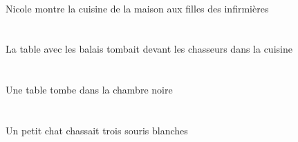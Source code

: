 \begin{exe}
\INDSgErgG{}   \NicoleDSgErgG{}    \DEFPlDatG{}    \DEFPlOblG{}   \infirmiereBPlOblG{}   \DEG{}   \filleCPlDatG{}   \DEFSgAbsG{}    \DEFSgOblG{}   \maisonDSgOblG{}   \DEG{}   \cuisineCSgAbsG{}  \montrerVdPrsCSgG{}\\
Nicole montre la cuisine de la maison aux filles des infirmières
\ex\glll
\DEFSgAbs{}    \DEFPlObl{}   \balaiCPlObl{}   \AVEC{}   \tableCSgAbs{}    \DEFPlObl{}    \DEFSgObl{}   \cuisineCSgObl{}   \DANS{}   \chasseurCPlObl{}   \DEVANT{}  \tomberViPstCSg{}\\
\DEFSgAbsP{}    \DEFPlOblP{}   \balaiCPlOblP{}   \AVECP{}   \tableCSgAbsP{}    \DEFPlOblP{}    \DEFSgOblP{}   \cuisineCSgOblP{}   \DANSP{}   \chasseurCPlOblP{}   \DEVANTP{}  \tomberViPstCSgP{}\\
\DEFSgAbsG{}    \DEFPlOblG{}   \balaiCPlOblG{}   \AVECG{}   \tableCSgAbsG{}    \DEFPlOblG{}    \DEFSgOblG{}   \cuisineCSgOblG{}   \DANSG{}   \chasseurCPlOblG{}   \DEVANTG{}  \tomberViPstCSgG{}\\
La table avec les balais tombait devant les chasseurs dans la cuisine
\ex\glll
\DEFSgObl{}   \noirBSg{}   \chambreBSgObl{}   \DANS{}   \INDSgAbs{}   \tableCSgAbs{}  \tomberViPrsCSg{}\\
\DEFSgOblP{}   \noirBSgP{}   \chambreBSgOblP{}   \DANSP{}   \INDSgAbsP{}   \tableCSgAbsP{}  \tomberViPrsCSgP{}\\
\DEFSgOblG{}   \noirBSgG{}   \chambreBSgOblG{}   \DANSG{}   \INDSgAbsG{}   \tableCSgAbsG{}  \tomberViPrsCSgG{}\\
Une table tombe dans la chambre noire
\ex\glll
\INDSgErg{}   \petitDSg{}   \chatDSgErg{}   \INDPlAbs{}   \troisAPl{}   \blancAPl{}   \sourisAPlAbs{}  \chasserVtPstAPl{}\\
\INDSgErgP{}   \petitDSgP{}   \chatDSgErgP{}   \INDPlAbsP{}   \troisAPlP{}   \blancAPlP{}   \sourisAPlAbsP{}  \chasserVtPstAPlP{}\\
\INDSgErgG{}   \petitDSgG{}   \chatDSgErgG{}   \INDPlAbsG{}   \troisAPlG{}   \blancAPlG{}   \sourisAPlAbsG{}  \chasserVtPstAPlG{}\\
Un petit chat chassait trois souris blanches
\ex\glll
\DEFPlAbs{}   \rougeBPl{}   \fruitBPlAbs{}    \DEFSgObl{}    \DEFSgObl{}    \INDSgObl{}   \NabilBSgObl{}   \DE{}   \filleCSgObl{}   \DE{}   \villageASgObl{}   \DANS{}  \arriverViPrsBPl{}\\
\DEFPlAbsP{}   \rougeBPlP{}   \fruitBPlAbsP{}    \DEFSgOblP{}    \DEFSgOblP{}    \INDSgOblP{}   \NabilBSgOblP{}   \DEP{}   \filleCSgOblP{}   \DEP{}   \villageASgOblP{}   \DANSP{}  \arriverViPrsBPlP{}\\

\end{exe}
